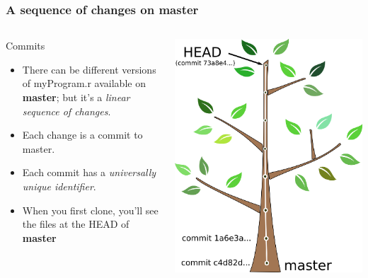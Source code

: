 \documentclass{beamer}
\begin{document}
\begin{frame}
  \frametitle{A sequence of changes on master}
  \begin{columns}[T]
    \begin{column}{.5\textwidth}
      \begin{block}{Commits}
        \begin{itemize}
          \item There can be different versions of myProgram.r available on
            \textbf{master}; but it's a \emph{linear sequence of changes}.

          \item Each change is a \alert{commit to master}.

          \item Each commit has a \emph{universally unique identifier}.

          \item When you first clone, you'll see the files at the \alert{HEAD}
            of \textbf{master}
        \end{itemize}
      \end{block}
    \end{column}
    \begin{column}{.5\textwidth}
      \includegraphics[width=\textwidth]{tree_mastercommits_head.png}
    \end{column}
  \end{columns}
\end{frame}
\end{document}

